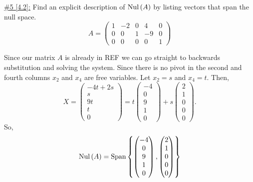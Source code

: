 \documentclass{exam}
\begin{document}
\underline{\#5 [4.2]:} Find an explicit description of $\text{Nul}\left(A\right)$ by listing vectors that span the null space. 
\[
    A = \begin{pmatrix}
        1 & -2 & 0 & 4 & 0 \\
        0 & 0 & 1 & -9 & 0 \\
        0 & 0 & 0 & 0 & 1
    \end{pmatrix}
\]
\begin{solution}
    Since our matrix $A$ is already in REF we can go straight to backwards substitution and solving the system. Since there is no pivot in the second and fourth columns $x_2$ and $x_4$ are free variables. Let $x_2 = s$ and $x_4 = t$. Then, 
    \[
        X = \begin{pmatrix}
            -4t + 2s \\ s \\ 9t \\ t \\ 0
        \end{pmatrix} 
        = t\begin{pmatrix}
            -4 \\ 0 \\ 9 \\ 1 \\ 0 
        \end{pmatrix}
        + s\begin{pmatrix}
            2 \\ 1 \\ 0 \\ 0 \\ 0
        \end{pmatrix}.
    \]
    So, 
    \[
        \text{Nul}\left(A\right) = \text{Span}\left\{
            \begin{pmatrix}
                -4 \\ 0 \\ 9 \\ 1 \\ 0
            \end{pmatrix},
            \begin{pmatrix}
                2 \\ 1 \\ 0 \\ 0 \\ 0
            \end{pmatrix}
         \right\}
    \]
\end{solution}
\end{document}
